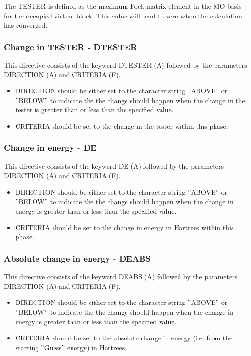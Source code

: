\documentclass[11pt,fleqn]{article}
\begin{document}
The TESTER is defined as the maximum Fock matrix element in the MO
basis for the occupied-virtual block. This value will tend to zero
when the calculation has converged.

\subsubsection[Change in TESTER - DTESTER]{Change in TESTER - DTESTER}
This directive consists of the keyword DTESTER (A) followed
by the parameters DIRECTION (A) and CRITERIA (F).

\begin{itemize}
\item DIRECTION should be either set to the character string ''ABOVE'' or
  ''BELOW'' to indicate the the change should happen when the change
  in the tester is greater than or less than the specified value.
\item CRITERIA should be set to the change in the tester within this
  phase.
\end{itemize}


\subsubsection[Change in energy - DE]{Change in energy - DE}
This directive consists of the keyword DE (A) followed
by the parameters DIRECTION (A) and CRITERIA (F).

\begin{itemize}
\item DIRECTION should be either set to the character string ''ABOVE'' or
  ''BELOW'' to indicate the the change should happen when the change in energy is
  greater than or less than the specified value.
\item CRITERIA should be set to the change in energy in Hartrees
  within this phase.
\end{itemize}

\subsubsection[Absolute change in energy - DEABS]{Absolute change in energy - DEABS}
This directive consists of the keyword DEABS (A) followed by the
parameters DIRECTION (A) and CRITERIA (F).

\begin{itemize}
\item DIRECTION should be either set to the character string ''ABOVE'' or
  ''BELOW'' to indicate the the change should happen when the change in energy is
  greater than or less than the specified value.
\item CRITERIA should be set to the absolute change in energy
  (i.e. from the starting ''Guess'' energy) in Hartrees.
\end{itemize}
\end{document}

